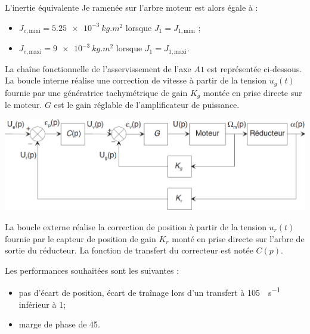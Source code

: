 \documentclass[10pt,fleqn]{article} %
\begin{document}
\begin{multicols}{2}
L’inertie équivalente Je ramenée sur l’arbre moteur est alors égale à : 
\begin{itemize}
\item $J_{e,\text{mini}} = \SI{5,25e-3}{kg.m^2}$ lorsque $J_1=J_{1,\text{mini}}$ ; 
\item $J_{e,\text{maxi}} =\SI{9e-3}{kg.m^2}$ lorsque $J_1=J_{1,\text{maxi}}$.
\end{itemize}

La chaîne fonctionnelle de l’asservissement de l’axe $A1$ est représentée ci-dessous. La boucle interne réalise une correction de vitesse à partir de la tension $u_g(t)$ fournie par une 
génératrice  tachymétrique  de  gain $K_g$ montée  en  prise  directe  sur  le moteur. $G$  est  le  gain 
réglable de l’amplificateur de puissance. 

\begin{center}
\includegraphics[width=\linewidth]{images/fig_02}

\end{center}
La boucle externe  réalise  la  correction de position à partir de  la  tension $u_r(t)$  fournie par  le 
capteur de position de gain $K_r$ monté  en prise directe  sur  l’arbre de  sortie du  réducteur. La 
fonction de transfert du correcteur est notée $C(p)$. 

Les performances souhaitées sont les suivantes : 
\begin{itemize}
\item pas d’écart de position, écart de traînage lors d’un transfert à \SI{105}{\degres.s^{-1}} inférieur à 1\degres ; 
\item marge de phase de 45\degres. 
\end{itemize}




\end{multicols}
\end{document}
